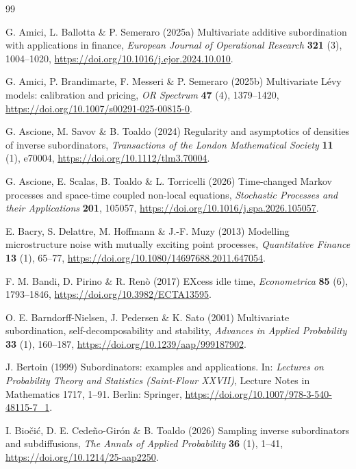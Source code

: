 \documentclass{ws-ijtaf}
\begin{document}
\begin{thebibliography}{99}

 G. Amici, L. Ballotta \&
P. Semeraro (2025a) Multivariate additive subordination with applications in
finance, {\it European Journal of Operational Research} {\bf 321} (3),
1004--1020, \url{https://doi.org/10.1016/j.ejor.2024.10.010}.

 G. Amici, P. Brandimarte,
F. Messeri \& P. Semeraro (2025b) Multivariate Lévy models: calibration and
pricing, {\it OR Spectrum} {\bf 47} (4), 1379--1420,
\url{https://doi.org/10.1007/s00291-025-00815-0}.

 G. Ascione, M. Savov \& B. Toaldo
(2024) Regularity and asymptotics of densities of inverse subordinators, {\it
Transactions of the London Mathematical Society} {\bf 11} (1), e70004,
\url{https://doi.org/10.1112/tlm3.70004}.

 G. Ascione, E. Scalas, B. Toaldo \&
L. Torricelli (2026) Time-changed Markov processes and space-time coupled
non-local equations, {\it Stochastic Processes and their Applications}
{\bf 201}, 105057, \url{https://doi.org/10.1016/j.spa.2026.105057}.

 E. Bacry, S. Delattre, M. Hoffmann \&
J.-F. Muzy (2013) Modelling microstructure noise with mutually exciting point
processes, {\it Quantitative Finance} {\bf 13} (1), 65--77,
\url{https://doi.org/10.1080/14697688.2011.647054}.

 F. M. Bandi, D. Pirino \& R. Renò
(2017) EXcess idle time, {\it Econometrica} {\bf 85} (6), 1793--1846,
\url{https://doi.org/10.3982/ECTA13595}.

 O. E. Barndorff-Nielsen,
J. Pedersen \& K. Sato (2001) Multivariate subordination, self-decomposability
and stability, {\it Advances in Applied Probability} {\bf 33} (1), 160--187,
\url{https://doi.org/10.1239/aap/999187902}.

 J. Bertoin (1999) Subordinators: examples and
applications. In: {\it Lectures on Probability Theory and Statistics
(Saint-Flour XXVII)}, Lecture Notes in Mathematics 1717, 1--91. Berlin:
Springer, \url{https://doi.org/10.1007/978-3-540-48115-7_1}.

 I. Biočić, D. E. Cedeño-Girón \&
B. Toaldo (2026) Sampling inverse subordinators and subdiffusions, {\it The
Annals of Applied Probability} {\bf 36} (1), 1--41,
\url{https://doi.org/10.1214/25-aap2250}.


\end{thebibliography}
\end{document}
